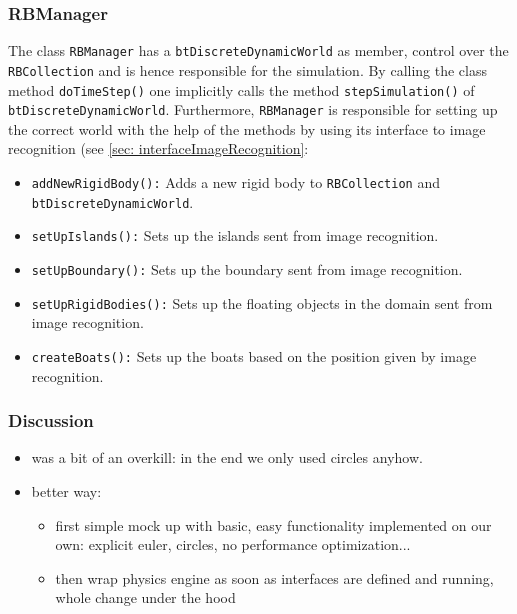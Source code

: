 \subsubsection*{RBManager}
\label{sec: rbManager}
The class \texttt{RBManager} has a \texttt{btDiscreteDynamicWorld} as member, control over the \texttt{RBCollection} and is hence responsible for the simulation. By calling the class method \texttt{doTimeStep()} one implicitly calls the method \texttt{stepSimulation()} of \texttt{btDiscreteDynamicWorld}. 
 Furthermore, \texttt{RBManager} is responsible for setting up the correct world with the help of the methods by using its  interface to image recognition (see \autoref{sec: interfaceImageRecognition}:
\begin{itemize}
\item \texttt{addNewRigidBody():} Adds a new rigid body to \texttt{RBCollection} and \texttt{btDiscreteDynamicWorld}.
\item \texttt{setUpIslands():} Sets up the islands sent from image recognition.
\item \texttt{setUpBoundary():} Sets up the boundary sent from image recognition.
\item \texttt{setUpRigidBodies():} Sets up the floating objects in the domain sent from image recognition.
\item \texttt{createBoats():} Sets up the boats based on the position given by image recognition.
\end{itemize}

\subsubsection{Discussion}
\begin{itemize}
\item was a bit of an overkill: in the end we only used circles anyhow.
\item better way: 
\begin{itemize}
\item first simple mock up with basic, easy functionality implemented on our own: explicit euler, circles, no performance optimization...
\item then wrap physics engine as soon as interfaces are defined and running, whole change under the hood
\end{itemize}
\end{itemize}

